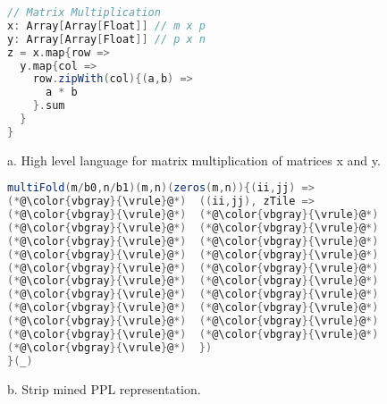 \begin{figure}
\centering

\begin{lstlisting}[language=Scala,numbers=none,basicstyle=\fontsize{9}{10}\beramonott]
// Matrix Multiplication
x: Array[Array[Float]] // m x p
y: Array[Array[Float]] // p x n
z = x.map{row =>
  y.map{col =>
    row.zipWith(col){(a,b) =>
      a * b
    }.sum
  }
}
\end{lstlisting}
a. High level language for matrix multiplication of matrices x and y.
\vspace{10pt}

\begin{lstlisting}[language=Scala,numbers=none,basicstyle=\fontsize{9}{10}\beramonott]
multiFold(m/b0,n/b1)(m,n)(zeros(m,n)){(ii,jj) =>
(*@\color{vbgray}{\vrule}@*)  ((ii,jj), zTile =>
(*@\color{vbgray}{\vrule}@*)  (*@\color{vbgray}{\vrule}@*)  map(b0,b1){(i,j) =>
(*@\color{vbgray}{\vrule}@*)  (*@\color{vbgray}{\vrule}@*)  (*@\color{vbgray}{\vrule}@*)  tile = multiFold(p/b2)(1)(0){ kk =>
(*@\color{vbgray}{\vrule}@*)  (*@\color{vbgray}{\vrule}@*)  (*@\color{vbgray}{\vrule}@*)  (*@\color{vbgray}{\vrule}@*)  xTile = x.copy(b0 + ii, b2 + kk)
(*@\color{vbgray}{\vrule}@*)  (*@\color{vbgray}{\vrule}@*)  (*@\color{vbgray}{\vrule}@*)  (*@\color{vbgray}{\vrule}@*)  yTile = y.copy(b2 + kk, b1 + jj)
(*@\color{vbgray}{\vrule}@*)  (*@\color{vbgray}{\vrule}@*)  (*@\color{vbgray}{\vrule}@*)  (*@\color{vbgray}{\vrule}@*)  dprod = fold(b2)(0){ k =>
(*@\color{vbgray}{\vrule}@*)  (*@\color{vbgray}{\vrule}@*)  (*@\color{vbgray}{\vrule}@*)  (*@\color{vbgray}{\vrule}@*)  (*@\color{vbgray}{\vrule}@*)  acc => acc + xTile(i,k) * yTile(k,j)
(*@\color{vbgray}{\vrule}@*)  (*@\color{vbgray}{\vrule}@*)  (*@\color{vbgray}{\vrule}@*)  (*@\color{vbgray}{\vrule}@*)  }{(a,b) => a + b})
(*@\color{vbgray}{\vrule}@*)  (*@\color{vbgray}{\vrule}@*)  (*@\color{vbgray}{\vrule}@*)  (*@\color{vbgray}{\vrule}@*)  (0, elemTile => elemTile + dprod)
(*@\color{vbgray}{\vrule}@*)  (*@\color{vbgray}{\vrule}@*)  (*@\color{vbgray}{\vrule}@*)  }{(a,b) => a + b}
(*@\color{vbgray}{\vrule}@*)  (*@\color{vbgray}{\vrule}@*)  (*@\color{vbgray}{\vrule}@*)  zTile(i,j) + tile
(*@\color{vbgray}{\vrule}@*)  })
}(_)
\end{lstlisting}
b. Strip mined PPL representation.
\vspace{10pt}


\end{figure}
